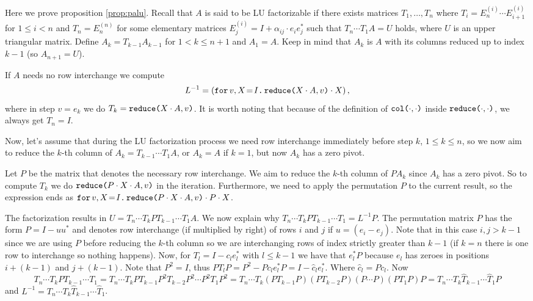 Here we prove proposition \ref{prop:palu}. Recall that $A$ is said to be LU factorizable if there exists matrices $T_1,\ldots, T_{n}$ where $T_i=E_{n}^{(i)}\cdots E_{i+1}^{(i)}$ for $1\leq i < n$ and $T_n=E^{(n)}_n$ for some elementary matrices $E_{j}^{(i)}=I+\alpha_{ij}\cdot e_{i}e_{j}^{*}$ such that $T_{n}\cdots T_1A=U$ holds, where $U$ is an upper triangular matrix. Define $A_k=T_{k-1}A_{k-1}$ for $1< k\leq n+1$ and $A_1=A$. Keep in mind that $A_k$ is $A$ with its columns reduced up to index $k-1$ (so $A_{n+1}=U$). 

If $A$ needs no row interchange we compute $$L^{-1}=\left( \initf{I}{v}{X}{\red{X\cdot A}{v}\cdot X} \right),$$ where in step $v=e_k$ we do $T_k=\red{X\cdot A}{v}$. It is worth noting that because of the definition of $\ccol{\cdot}{\cdot}$ inside $\red{\cdot}{\cdot}$, we always get $T_n=I$.


Now, let's assume that during the LU factorization process we need row interchange immediately before step $k$, $1\leq k\leq n$, so we now aim to reduce the $k$-th column of $A_k=T_{k-1}\cdots T_1A$, or $A_k=A$ if $k=1$, but now $A_k$ has a zero pivot. 

Let $P$ be the matrix that denotes the necessary row interchange. We aim to reduce the $k$-th column of $PA_{k}$ since $A_{k}$ has a zero pivot. So to compute $T_k$ we do $\red{P\cdot X\cdot A}{v}$ in the iteration. Furthermore, we need to apply the permutation $P$ to the current result, so the expression ends as $\initf{I}{v}{X}{\red{P\cdot X\cdot A}{v}\cdot P\cdot X}$.

The factorization results in $U=T_{n}\cdots T_kPT_{k-1}\cdots T_1A$. We now explain why $T_{n}\cdots T_kPT_{k-1}\cdots T_1 = L^{-1}P.$ The permutation matrix $P$ has the form $P = I - uu^*$ and denotes row interchange (if multiplied by right) of rows $i$ and $j$ if $u=(e_{i}-e_{j})$. Note that in this case $i,j>k-1$ since we are using $P$ before reducing the $k$-th column so we are interchanging rows of index strictly greater than $k-1$ (if $k=n$ there is one row to interchange so nothing happens). Now, for $T_{l}=I-c_le_l^*$ with $l\leq k-1$ we have that $e_l^*P$ because $e_l$ has zeroes in positions $i+(k-1)$ and $j+(k-1)$. Note that $P^2=I$, thus $PT_lP=P^2-Pc_le_l^*P=I-\widehat{c}_le_l^*.$ Where $\widehat{c}_l=Pc_l$. Now $$T_{n}\cdots T_kPT_{k-1}\cdots T_1=T_{n}\cdots T_kPT_{k-1}P^2T_{k-2}P^2\cdots P^2 T_1P^2=T_{n}\cdots T_k(PT_{k-1}P)(PT_{k-2}P)(P\cdots P)(PT_1P)P=T_{n}\cdots T_k\widehat{T}_{k-1}\cdots \widehat{T}_1P$$ and $L^{-1} = T_{n}\cdots T_k\widehat{T}_{k-1}\cdots \widehat{T}_1$.

